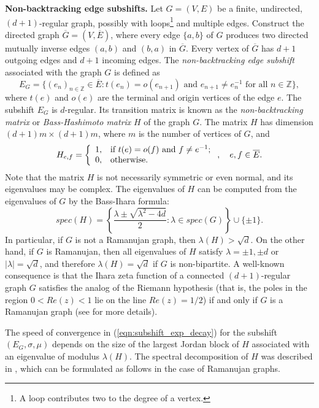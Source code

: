 \documentclass[12pt]{article}
\theoremstyle{definition}
\begin{document}
\vspace{0.2cm}
\textbf{Non-backtracking edge subshifts.}
Let $G=(V,E)$ be a finite, undirected, $(d+1)$-regular graph, possibly with loops\footnote{A loop contributes two to the degree of a vertex.} and multiple edges. Construct the directed graph $\overline{G}=(V,\overline{E})$, where every edge $\{a,b\}$ of $G$ produces two directed mutually inverse edges $(a,b)$ and $(b,a)$ in $\overline{G}$. Every vertex of $\overline{G}$ has $d+1$ outgoing edges and $d+1$ incoming edges. The \textit{non-backtracking edge subshift} associated with the graph $G$ is defined as
\[
E_G=\{ (e_n)_{n\in\mathbb{Z}}\in \overline{E} : t(e_n)=o(e_{n+1}) \mbox{ and } e_{n+1}\neq e_n^{-1} \mbox{ for all $n\in\mathbb{Z}$} \},
\]
where $t(e)$ and $o(e)$ are the terminal and origin vertices of the edge $e$. The subshift $E_G$ is $d$-regular. Its transition matrix is known as the \textit{non-backtracking matrix} or \textit{Bass-Hashimoto matrix} $H$ of the graph $G$. The matrix $H$ has dimension $(d+1)m\times (d+1)m$, where $m$ is the number of vertices of $G$, and
\[
H_{e,f}=\left\{
          \begin{array}{ll}
            1, & \hbox{if $t(e)=o(f)$ and $f\neq e^{-1}$;} \\
            0, & \hbox{otherwise.}
          \end{array}
        \right., \quad e,f\in \overline{E}.
\]
Note that the matrix $H$ is not necessarily symmetric or even normal, and its eigenvalues may be complex. The eigenvalues of $H$ can be computed from the eigenvalues of $G$ by the Bass-Ihara formula:
\[
spec(H)=\left\{ \frac{\lambda\pm \sqrt{\lambda^2-4d}}{2} : \lambda\in spec(G) \right\} \cup \{\pm 1\}.
\]
In particular, if $G$ is not a Ramanujan graph, then $\lambda(H)>\sqrt{d}$. On the other hand, if $G$ is Ramanujan, then all eigenvalues of $H$ satisfy $\lambda=\pm 1, \pm d$ or $|\lambda|=\sqrt{d}$, and therefore $\lambda(H)=\sqrt{d}$ if $G$ is non-bipartite. A well-known consequence is that the Ihara zeta function of a connected $(d+1)$-regular graph $G$ satisfies the analog of the Riemann hypothesis (that is, the poles in the region $0<Re(z)<1$ lie on the line $Re(z)=1/2$) if and only if $G$ is a Ramanujan graph (see \cite{Terras2011} for more details).

The speed of convergence in (\ref{eqn:subshift_exp_decay}) for the subshift $(E_G,\sigma,\mu)$ depends on the size of the largest Jordan block of $H$ associated with an eigenvalue of modulus $\lambda(H)$. The spectral decomposition of $H$ was described in \cite[Prop. 3.1]{LubetzkyPeres2016}, which can be formulated as follows in the case of Ramanujan graphs.
\end{document}
